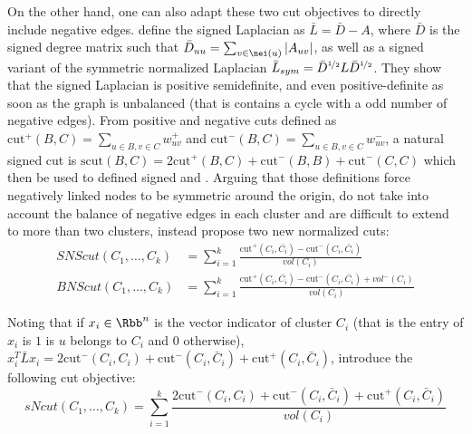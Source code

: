On the other hand, one can also adapt these two cut objectives to directly include negative edges.
\Textcite{Luca10} define the signed Laplacian as $\bar{L} = \bar{D} - A$, where $\bar{D}$ is the
signed degree matrix such that $\bar{D}_{uu} = \sum_{v\in \nei(u)} |A_{uv}|$, as well as a signed
variant of the symmetric normalized Laplacian $\bar{L}_{sym}  = \bar{D}^{\nicefrac{1}{2}} L
\bar{D}^{\nicefrac{1}{2}}$. They show that the signed Laplacian is positive semidefinite, and
even positive-definite as soon as the graph is unbalanced (that is contains a cycle with a odd
number of negative edges). From positive and negative cuts defined as $\mathrm{cut}^+(B, C) =
\sum_{u\in B, v\in C} w^+_{uv}$ and $\mathrm{cut}^-(B, C) = \sum_{u\in B, v\in C} w^-_{uv}$, a
natural signed cut is $\mathrm{scut}(B, C) = 2\mathrm{cut}^+(B, C) + \mathrm{cut}^-(B, B) +
\mathrm{cut}^-(C, C)$ which then be used to defined signed \rcut{} and \ncut{}. Arguing that those
definitions force negatively linked nodes to be symmetric around the origin, do not take into
account the balance of negative edges in each cluster and are difficult to extend to more than two
clusters, \textcite{SignedEmbedding15} instead propose two new normalized cuts:
\begin{align*}
  SNScut(C_1, \ldots, C_k) &= \sum_{i=1}^k
  \frac{\mathrm{cut}^+(C_i, \bar{C_i})-\mathrm{cut}^-(C_i, \bar{C_i})}{vol(C_i)}  \\
  BNScut(C_1, \ldots, C_k) &= \sum_{i=1}^k
  \frac{\mathrm{cut}^+(C_i, \bar{C_i})-\mathrm{cut}^-(C_i, \bar{C_i})+vol^-(C_i)}{vol(C_i)}
\end{align*}

Noting that if $x_i\in\Rbb^n$ is the vector indicator of cluster $C_i$ (that is the \uth{} entry of
$x_i$ is $1$ is $u$ belongs to $C_i$ and $0$ otherwise), $x_i^T\bar{L}x_i = 2\mathrm{cut}^-(C_i,
C_i) + \mathrm{cut}^-(C_i, \bar{C}_i) + \mathrm{cut}^+(C_i, \bar{C}_i)$,
\textcite{mSemanticWordCC17} introduce the following cut objective:
\begin{equation*}
  sNcut(C_1, \ldots, C_k) = \sum_{i=1}^k
  \frac{2\mathrm{cut}^-(C_i, C_i) + \mathrm{cut}^-(C_i, \bar{C}_i) + \mathrm{cut}^+(C_i, \bar{C}_i)}{vol(C_i)}
\end{equation*}


